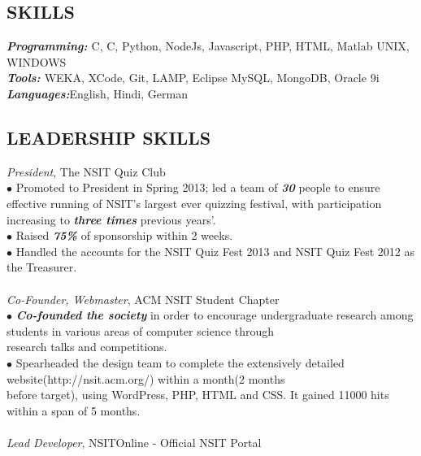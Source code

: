 \documentclass[10.5pt]{article}
\newcommand{\CPP}
{C\nolinebreak[4]\hspace{-.05em}\raisebox{.22ex}{\footnotesize\bf ++}}
\begin{document}
\subsection*{SKILLS}
\vspace{-3pt}

	{\it {\bf Programming: }}C, \CPP, Python, NodeJs, Javascript, PHP, HTML, Matlab  
         UNIX, WINDOWS    
	\\{\it {\bf Tools: }}WEKA, XCode, Git, LAMP, Eclipse
          MySQL, MongoDB, Oracle 9i  
         \\{\it {\bf Languages:}}English, Hindi, German  
   

\subsection*{LEADERSHIP SKILLS }
\vspace{-3pt}
{\emph{President}}, The NSIT Quiz Club
\\
$\bullet$ Promoted to President in Spring 2013; led a team of  {\it {\bf 30}} people to ensure effective running of NSIT's largest ever quizzing festival, with participation increasing to  {\it {\bf three times}} previous years'. 
\\
$\bullet$ Raised  {\it {\bf 75\% }}of sponsorship within 2 weeks. 
\\
$\bullet$ Handled the accounts for the NSIT Quiz Fest 2013 and NSIT Quiz Fest 2012 as the Treasurer.
\\
\\
{\emph{Co-Founder, Webmaster}}, ACM NSIT Student Chapter
\\
$\bullet$ {\it {\bf Co-founded the society}} in order to encourage undergraduate research among students in various areas of computer science through
\\\hspace*{2.5mm}research talks and competitions.
\\
$\bullet$ Spearheaded the design team to complete the extensively detailed website(http://nsit.acm.org/) within a month(2 months
\\\hspace*{2.5mm}before target), using WordPress, PHP, HTML and CSS. It gained 11000 hits within a span of 5 months.
\\
\\
{\emph{Lead Developer}},	NSITOnline - Official NSIT Portal
\end{document}
